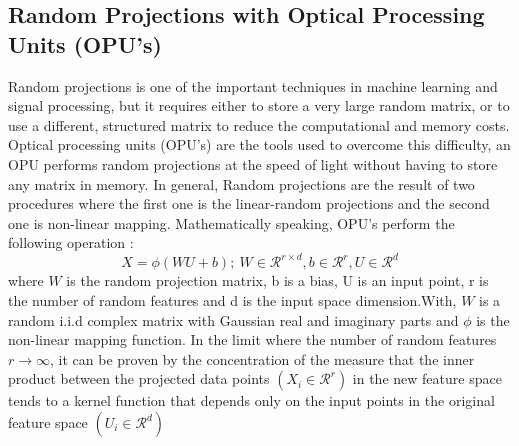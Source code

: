 \subsection{Random Projections with Optical Processing Units (OPU's)}
Random projections is one of the important techniques in machine learning and signal processing, but it requires either to store a very large random matrix, or to use a
different, structured matrix to reduce the computational and memory costs. Optical processing units (OPU's) are the tools used to overcome this difficulty, an OPU performs random projections at the speed of light without having to store any matrix in memory. In general, Random projections are the result of two procedures where the first one is the linear-random projections and the second one is non-linear mapping.
Mathematically speaking, OPU's perform the following operation \citep{saade_opu}:
\begin{equation}
\label{OPU_equation}
    X=\phi(WU+b);~W\in \mathcal{R}^{r\times d},b\in \mathcal{R}^r, U\in \mathcal{R}^d
\end{equation}
where $W$ is the random projection matrix, b is a bias, U is an input point, r is the number of random features and d is the input space dimension.With, $W$ is a random i.i.d complex matrix with Gaussian real and imaginary parts and $\phi$ is the non-linear mapping function.\newline
In the limit where the number of random features $r\xrightarrow{}\infty$, it can be proven by the concentration of the measure that the inner product between the projected data points $(X_i\in \mathcal{R}^r)$ in the new feature space tends to a kernel function that depends only on the input points in the original feature space $(U_i\in \mathcal{R}^d)$

